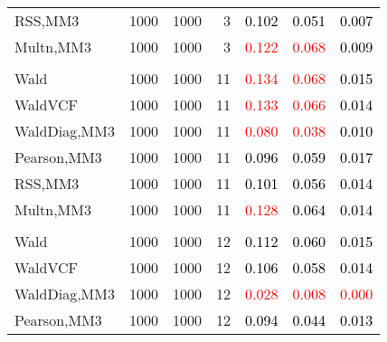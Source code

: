 \documentclass[
]{article}
\begin{document}
\begin{table}[H]
{\begin{tabular}[t]{lrrrrrr}
\hspace{1em}RSS,MM3 & 1000 & 1000 & 3 & \textcolor{black}{0.102} & \textcolor{black}{0.051} & \textcolor{black}{0.007}\\
\hspace{1em}Multn,MM3 & 1000 & 1000 & 3 & \textcolor{red}{0.122} & \textcolor{red}{0.068} & \textcolor{black}{0.009}\\
\addlinespace[0.3em]
\multicolumn{7}{l}{\textbf{1F 15V}}\\
\hspace{1em}Wald & 1000 & 1000 & 11 & \textcolor{red}{0.134} & \textcolor{red}{0.068} & \textcolor{black}{0.015}\\
\hspace{1em}WaldVCF & 1000 & 1000 & 11 & \textcolor{red}{0.133} & \textcolor{red}{0.066} & \textcolor{black}{0.014}\\
\hspace{1em}WaldDiag,MM3 & 1000 & 1000 & 11 & \textcolor{red}{0.080} & \textcolor{red}{0.038} & \textcolor{black}{0.010}\\
\hspace{1em}Pearson,MM3 & 1000 & 1000 & 11 & \textcolor{black}{0.096} & \textcolor{black}{0.059} & \textcolor{black}{0.017}\\
\hspace{1em}RSS,MM3 & 1000 & 1000 & 11 & \textcolor{black}{0.101} & \textcolor{black}{0.056} & \textcolor{black}{0.014}\\
\hspace{1em}Multn,MM3 & 1000 & 1000 & 11 & \textcolor{red}{0.128} & \textcolor{black}{0.064} & \textcolor{black}{0.014}\\
\addlinespace[0.3em]
\multicolumn{7}{l}{\textbf{2F 10V}}\\
\hspace{1em}Wald & 1000 & 1000 & 12 & \textcolor{black}{0.112} & \textcolor{black}{0.060} & \textcolor{black}{0.015}\\
\hspace{1em}WaldVCF & 1000 & 1000 & 12 & \textcolor{black}{0.106} & \textcolor{black}{0.058} & \textcolor{black}{0.014}\\
\hspace{1em}WaldDiag,MM3 & 1000 & 1000 & 12 & \textcolor{red}{0.028} & \textcolor{red}{0.008} & \textcolor{red}{0.000}\\
\hspace{1em}Pearson,MM3 & 1000 & 1000 & 12 & \textcolor{black}{0.094} & \textcolor{black}{0.044} & \textcolor{black}{0.013}\\

\end{tabular}}
\end{table}
\end{document}
